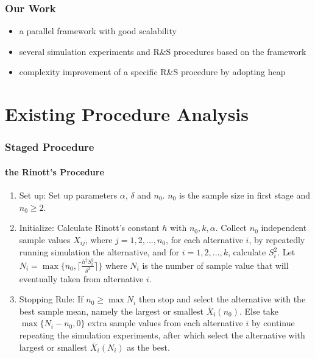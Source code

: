 \documentclass{beamer}
\begin{document}
\begin{frame}
\frametitle{Our Work}
\begin{itemize}
\item a parallel framework with good scalability
\vspace{\baselineskip}
\item several simulation experiments and R\&S procedures based on the framework
\vspace{\baselineskip}
\item complexity improvement of a specific R\&S procedure by adopting heap
\end{itemize}
\end{frame}

\section{Existing Procedure Analysis}

\begin{frame}
\frametitle{Staged Procedure}
\framesubtitle{the Rinott's Procedure}
\begin{enumerate}
\item{Set up: } Set up parameters $\alpha$, $\delta$ and $n_0$. $n_0$ is the sample size in first stage and $n_0 \geqslant 2$.
\item{Initialize: } Calculate Rinott's constant $h$ with $n_0, k, \alpha$. Collect $n_0$ independent sample values $X_{ij}$, where $j = 1, 2,...,n_0$, for each alternative $i$, by repeatedly running simulation the alternative, and for $i = 1, 2,...,k$, calculate $S_i^2$. Let 
$ N_i = \max\{n_0, \lceil \frac{h^2S_i^2}{\delta^2} \rceil\} $ where $N_i$ is the number of sample value that will eventually taken from alternative $i$.
\item{Stopping Rule: } If $n_0 \geqslant \max N_i$ then stop and select the alternative with the best sample mean, namely the largest or smallest $\bar{X}_i(n_0)$. Else take $\max\{N_i - n_0, 0\}$ extra sample values from each alternative $i$ by continue repeating the simulation experiments, after which select the alternative with largest or smallest $\bar{X}_i(N_i)$ as the best.
\end{enumerate}
\end{frame}
\end{document}
